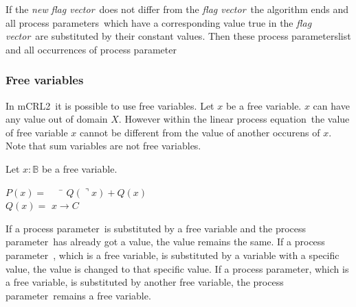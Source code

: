 \documentclass[a4paper,10pt]{article}
\newcommand{\lpe}{linear process equation}
\newcommand{\mcrl}{mCRL2}
\newcommand{\pp}{process parameter}
\newcommand{\pps}{process parameters}
\newcommand{\ti}{\textit}
\newcommand{\fv}{\textit{flag vector}}
\begin{document}
If the \ti{new} \fv\ does not differ from the \fv\ the algorithm ends and all \pps\ which have a corresponding value true in the \fv\ are substituted by their constant values. Then these \pps list and all occurrences of \pp\ 

\subsubsection{Free variables}
In \mcrl\ it is possible to use free variables. %
Let $x$ be a free variable. $x$ can have any value out of domain $X$. However within the \lpe\ the value of free variable $x$ cannot be different from the value of another occurens of $x$. Note that sum variables are not free variables.

\begin{example}
Let $x: \mathbb{B}$ be a free variable.
\begin{tabbing}
$P(x) =$ \verb"  " \= $ Q(\urcorner x) + Q(x) $ \\
$Q(x) =$ \> $ x \rightarrow C $\
\end{tabbing}

\end{example}


If a \pp\ is substituted by a free variable and the \pp\ has already got a value, the value remains the same. If a \pp\ , which is a free variable, is substituted by a variable with a specific value, the value is changed to that specific value. If a \pp , which is a free variable, is substituted by another free variable, the \pp\ remains a free variable. 
\end{document}
